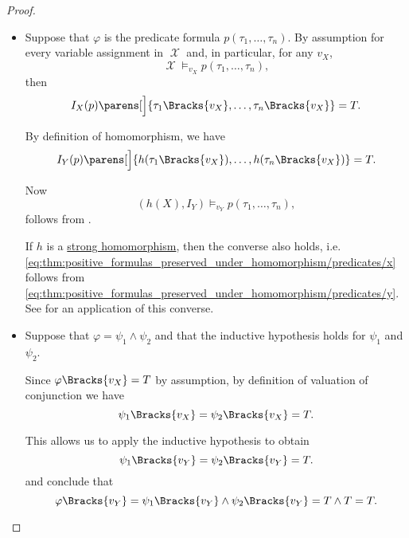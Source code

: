 \begin{proof}
\begin{itemize}
    \item Suppose that \( \varphi \) is the predicate formula \( p(\tau_1, \ldots, \tau_n) \). By assumption for every variable assignment in \( \mscrX \) and, in particular, for any \( v_X \),
    \begin{equation*}
      \mscrX \vDash_{v_X} p(\tau_1, \ldots, \tau_n),
    \end{equation*}
    then
    \begin{equation}\label{eq:thm:positive_formulas_preserved_under_homomorphism/predicates/x}
      I_X(p) \parens[\Big]{ \tau_1\Bracks{v_X}, \ldots, \tau_n\Bracks{v_X} } = T.
    \end{equation}

    By definition of homomorphism, we have
    \begin{equation}\label{eq:thm:positive_formulas_preserved_under_homomorphism/predicates/y}
      I_Y(p) \parens[\Big]{ h(\tau_1\Bracks{v_X}), \ldots, h(\tau_n\Bracks{v_X}) } = T.
    \end{equation}

    Now
    \begin{equation*}
      (h(X), I_Y) \vDash_{v_Y} p(\tau_1, \ldots, \tau_n),
    \end{equation*}
    follows from .

    If \( h \) is a \hyperref[rem:first_order_strong_homomorphism]{strong homomorphism}, then the converse also holds, i.e. \eqref{eq:thm:positive_formulas_preserved_under_homomorphism/predicates/x} follows from \eqref{eq:thm:positive_formulas_preserved_under_homomorphism/predicates/y}. See  for an application of this converse.

    \item Suppose that \( \varphi = \psi_1 \wedge \psi_2 \) and that the inductive hypothesis holds for \( \psi_1 \) and \( \psi_2 \).

    Since \( \varphi\Bracks{v_X} = T \) by assumption, by definition of valuation of conjunction we have
    \begin{equation*}
      \psi_1\Bracks{v_X}
      =
      \psi_2\Bracks{v_X}
      =
      T.
    \end{equation*}

    This allows us to apply the inductive hypothesis to obtain
    \begin{equation*}
      \psi_1\Bracks{v_Y}
      =
      \psi_2\Bracks{v_Y}
      =
      T.
    \end{equation*}
    and conclude that
    \begin{equation*}
      \varphi\Bracks{v_Y}
      =
      \psi_1\Bracks{v_Y} \wedge \psi_2\Bracks{v_Y}
      =
      T \wedge T
      =
      T.
    \end{equation*}


\end{itemize}
\end{proof}
